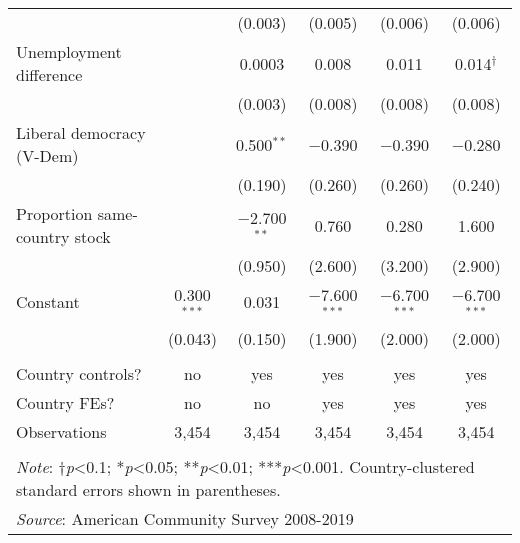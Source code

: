 \documentclass[
  11pt,
]{article}
\begin{document}
\begin{table}[H]
\begin{tabular}{@{\extracolsep{5pt}}lccccc}
  &  & (0.003) & (0.005) & (0.006) & (0.006) \\ 
  Unemployment difference &  & 0.0003 & 0.008 & 0.011 & 0.014$^{†}$ \\ 
  &  & (0.003) & (0.008) & (0.008) & (0.008) \\ 
  Liberal democracy (V-Dem) &  & 0.500$^{**}$ & $-$0.390 & $-$0.390 & $-$0.280 \\ 
  &  & (0.190) & (0.260) & (0.260) & (0.240) \\ 
  Proportion same-country stock &  & $-$2.700$^{**}$ & 0.760 & 0.280 & 1.600 \\ 
  &  & (0.950) & (2.600) & (3.200) & (2.900) \\ 
  Constant & 0.300$^{***}$ & 0.031 & $-$7.600$^{***}$ & $-$6.700$^{***}$ & $-$6.700$^{***}$ \\ 
  & (0.043) & (0.150) & (1.900) & (2.000) & (2.000) \\ 
 \hline \\[-1.8ex] 
Country controls? & no & yes & yes & yes & yes \\ 
Country FEs? & no & no & yes & yes & yes \\ 
Observations & 3,454 & 3,454 & 3,454 & 3,454 & 3,454 \\ 
\hline 
\hline \\[-1.8ex] 
\multicolumn{6}{l}{\parbox[t]{.8\textwidth}{\textit{Note}: †\textit{p}<0.1; *\textit{p}<0.05; **\textit{p}<0.01; ***\textit{p}<0.001. Country-clustered standard errors shown in parentheses.}} \\ 
\multicolumn{6}{l}{\textit{Source}: American Community Survey 2008-2019} \\ 
\end{tabular} 
\end{table}
\end{document}
